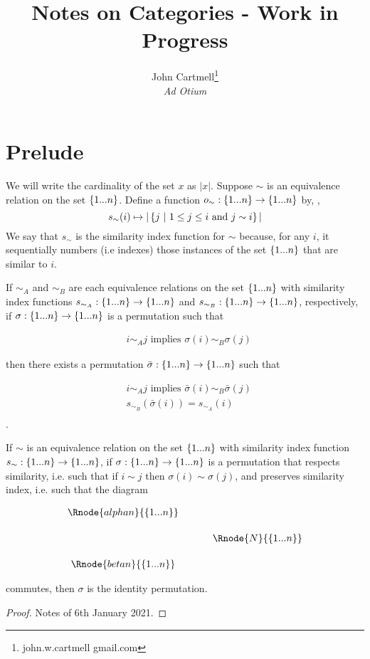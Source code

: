 \documentclass[10pt,a4paper]{scrartcl}
\title{Notes on Categories - Work in Progress}
\author{John Cartmell\footnote{john.w.cartmell gmail.com}\\ \normalsize{\textit{Ad Otium}}}
\begin{document}
\section{Prelude}
We will write the cardinality of the set $x$ as $|x|$.
Suppose $\sim$ is an equivalence relation on the set $\left\{1...n\right\}$.
Define a function $o_\sim : \left\{1...n\right\} \rightarrow \left\{1...n\right\}$ by, \foreachi,
$$
s_\sim(i) \mapsto |\left\{j \ \middle|\ 1 \leq j \leq i \mbox{ and }j \sim i\right\}|
$$
\noindent We say that $s_\sim$ is the similarity index
function for $\sim$ because, for any $i$, it sequentially numbers (i.e indexes) those instances
of the set $\left\{1...n\right\}$ that are similar to $i$. 

\begin{lemma}
If $\sim_A$ and $\sim_B$ are each equivalence relations on the set $\left\{1...n\right\}$ 
with similarity index functions $s_{\sim_A}: \left\{1...n\right\} \rightarrow \left\{1...n\right\}$
and $s_{\sim_B}: \left\{1...n\right\} \rightarrow \left\{1...n\right\}$, respectively,  if
$\sigma: \left\{1...n\right\} \rightarrow \left\{1...n\right\}$ is a permutation
such that
\newcommand{\sigmabar}{\bar{\sigma}}

\begin{align}
&i \sim_A j \mbox{ implies } \sigma(i) \sim_B \sigma(j) 
\end{align}

then there exists a permutation $\sigmabar: \set{\n} \morph \set{\n}$ such that


\begin{align}
&i \sim_A j \mbox{ implies } \sigmabar(i) \sim_B \sigmabar(j) \\
&s_{\sim_B}(\sigmabar(i))=s_{\sim_A}(i) \\
\end{align}.
\end{lemma}

\begin{lemma}
If $\sim$ is an equivalence relation on the set $\left\{1...n\right\}$ 
with similarity index function $s_\sim: \left\{1...n\right\} \rightarrow \left\{1...n\right\}$, if
$\sigma: \left\{1...n\right\} \rightarrow \left\{1...n\right\}$ is a permutation that respects similarity, i.e. such that
if $i \sim j$ then $\sigma(i) \sim \sigma(j)$, and preserves similarity index, i.e. such that
the diagram
\begin{center}
\begin{equation}
\label{preservingcopynumber}
\begin{array}{cp{.5cm}c}
\Rnode{alphan}{\set{\n}}  &&              \\ [0.5cm]
												  && \Rnode{N}{\set{\n}} \\ [0.5cm]
\Rnode{betan}{\set{\n}}   &&            
\end{array}
\end{equation}
\blabel{\sigma}
\end{center}
commutes,
then $\sigma$ is the identity permutation.
\end{lemma}
\begin{proof}
Notes of 6th January 2021.
\end{proof}
\end{document}

